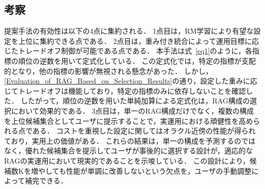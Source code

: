 \begin{table}[tb]
 \caption{ユーザ選択を含むRAG構成の性能評価の結果}
 \label{Evaluation_of_RAG_Based_on_Selection_Results_max}
 \centering
 \footnotesize
\end{table}


\subsection{考察} \label{sec5.4}
提案手法の有効性は以下の4点に集約される．
1点目は，RM学習により有望な設定を上位に集約できる点である．
2点目は，重み付き統合によって運用目標に応じたトレードオフ制御が可能である点である．
本手法は式~\eqref{eq1}のように，各指標の順位の逆数を用いて定式化している．
この定式化では，特定の指標が支配的となり，他の指標の影響が無視される懸念があった．
しかし，\ref{Evaluation_of_RAG_Based_on_Selection_Results}の通り，設定した重みに応じてトレードオフは機能しており，特定の指標のみに依存しないことを確認した．
したがって，順位の逆数を用いた単純加算による定式化は，RAG構成の選択において効果的である．
3点目は，単一のRAG構成だけでなく，複数の構成を上位候補集合としてユーザに提示することで，実運用における頑健性を高められる点である．
コストを重視した設定に関してはオラクル近傍の性能が得られており，実用上の価値がある．
これらの結果は，単一の構成を予測するのではなく，優れた候補集合を提示してユーザが事後的に選択する設計が，適応的なRAGの実運用において現実的であることを示唆している．
この設計により，候補数Kを増やしても性能が単調に改善しないという欠点を，ユーザの手動調整によって補完できる．

